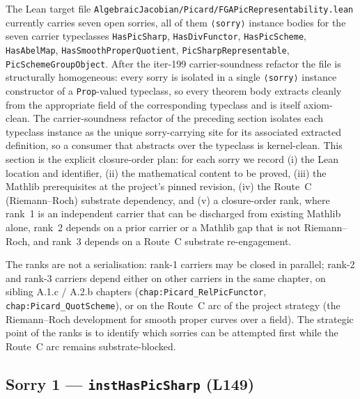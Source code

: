 The Lean target file
\texttt{AlgebraicJacobian/Picard/FGAPicRepresentability.lean} currently
carries seven open sorries, all of them \texttt{⟨sorry⟩} instance
bodies for the seven carrier typeclasses
\texttt{HasPicSharp}, \texttt{HasDivFunctor}, \texttt{HasPicScheme},
\texttt{HasAbelMap}, \texttt{HasSmoothProperQuotient},
\texttt{PicSharpRepresentable}, \texttt{PicSchemeGroupObject}.
After the iter-199 carrier-soundness refactor the file is
structurally homogeneous: every sorry is isolated in a single
\texttt{⟨sorry⟩} instance constructor of a \texttt{Prop}-valued
typeclass, so every theorem body extracts cleanly from the
appropriate field of the corresponding typeclass and is itself
axiom-clean. The carrier-soundness refactor of the
preceding section isolates each typeclass instance as the unique
sorry-carrying site for its associated extracted definition, so a
consumer that abstracts over the typeclass is kernel-clean. This
section is the explicit closure-order plan: for each sorry we record
(i) the Lean location and identifier, (ii) the mathematical content
to be proved, (iii) the Mathlib prerequisites at the project's pinned
revision, (iv) the Route~C (Riemann--Roch) substrate dependency, and
(v) a closure-order rank, where rank~1 is an independent carrier that
can be discharged from existing Mathlib alone, rank~2 depends on a
prior carrier or a Mathlib gap that is not Riemann--Roch, and rank~3
depends on a Route~C substrate re-engagement.

\medskip

The ranks are not a serialisation: rank-1 carriers may be closed in
parallel; rank-2 and rank-3 carriers depend either on other carriers
in the same chapter, on sibling A.1.c / A.2.b chapters
(\texttt{chap:Picard_RelPicFunctor},
\texttt{chap:Picard_QuotScheme}), or on the Route~C arc of the project
strategy (the Riemann--Roch development for smooth proper curves over
a field). The strategic point of the ranks is to identify which
sorries can be attempted first while the Route~C arc remains
substrate-blocked.

\subsection{Sorry 1 --- \texttt{instHasPicSharp} (L149)}
\label{subsec:sorry_has_pic_sharp}

